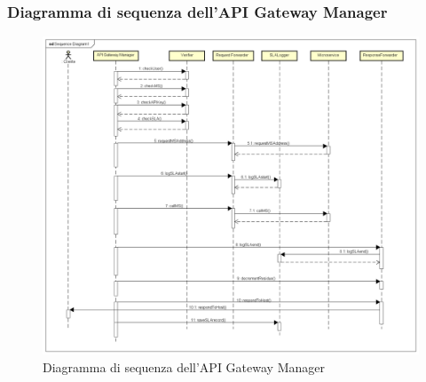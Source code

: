 \newpage
\subsubsection{Diagramma di sequenza dell'API Gateway Manager}
\begin{figure}[h]
	\centering
	\includegraphics[width=1.0\linewidth]{"IMG/Sequence Diagram1"}
	\caption{Diagramma di sequenza dell'API Gateway Manager}
\end{figure}


